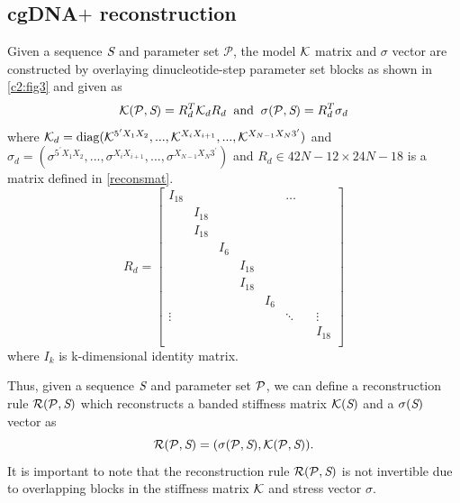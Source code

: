 \subsection{cgDNA$+$ reconstruction}\label{c2:s3sb1}
Given a sequence ${\textit{S}}$ and parameter set $\mathcal{P}$, the model ${\mathcal K}$ matrix and $\sigma$ vector are constructed by overlaying dinucleotide-step parameter set blocks as shown in \cref{c2:fig3} and given as
\begin{equation}
{\mathcal K}({\mathcal P},{\textit{S}}) = R_{d}^{T}{\mathcal K}_{d}R_{d} \;\; \text{and} \;\;   \sigma({\mathcal P},{\textit{S}}) = R_{d}^{T}\sigma_{d} 
\label{recons}
\end{equation}
where ${\mathcal K}_d = \text{diag}({\mathcal K}^{5^\prime X_1X_2},...,{\mathcal K}^{X_iX_{i+1}},...,{\mathcal K}^{X_{N-1}X_{N}3^\prime})$ and $\sigma_d = (\sigma^{5^\prime X_1X_2},...,\sigma^{X_iX_{i+1}},...,\sigma^{X_{N-1}X_{N}3^\prime})$
and $R_{d} \in 42N-12 \times 24N-18$ is a matrix defined in \cref{reconsmat}. 
\begin{equation}
R_{d} = \begin{bmatrix}
   I_{18} &  & &  & & \dots & &\\
   & I_{18} & &  & &  & & \\
   & I_{18} & &  & &  & & \\
   & & I_{6}  &  & &  & & \\
   &  & & I_{18} & &  & & \\
   &  & & I_{18} & &  & & \\
   &  & &  &I_{6} &  & & \\
  \vdots & & &  & &\ddots  & &\vdots \\
      &  & &  & &  & &I_{18} \\
 \end{bmatrix}
\label{reconsmat}
\end{equation}
where $I_k$ is k-dimensional identity matrix. 

Thus, given a sequence ${\textit{S}}$ and parameter set ${\mathcal P}$, we can define a reconstruction rule ${\mathcal R}({\mathcal P},{\textit{S}})$ which reconstructs a banded stiffness matrix ${\mathcal K}({\textit{S}})$ and a $\sigma({\textit{S}})$ vector as
\begin{equation}
{\mathcal R}({\mathcal P},{\textit{S}}) = (\sigma({\mathcal P},{\textit{S}}),{\mathcal K}({\mathcal P},{\textit{S}})).
\label{reconsmap}    
\end{equation}
It is important to note that the reconstruction rule ${\mathcal R}({\mathcal P},{\textit{S}})$ is not invertible due to overlapping blocks in the stiffness matrix ${\mathcal K}$ and stress vector $\sigma$.

